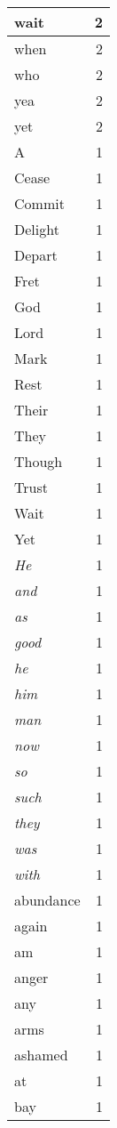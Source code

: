 \begin{center}
\begin{longtable}{l|r}
wait & 2 \\ \hline
when & 2 \\ \hline
who & 2 \\ \hline
yea & 2 \\ \hline
yet & 2 \\ \hline
A & 1 \\ \hline
Cease & 1 \\ \hline
Commit & 1 \\ \hline
Delight & 1 \\ \hline
Depart & 1 \\ \hline
Fret & 1 \\ \hline
God & 1 \\ \hline
Lord & 1 \\ \hline
Mark & 1 \\ \hline
Rest & 1 \\ \hline
Their & 1 \\ \hline
They & 1 \\ \hline
Though & 1 \\ \hline
Trust & 1 \\ \hline
Wait & 1 \\ \hline
Yet & 1 \\ \hline
\emph{He} & 1 \\ \hline
\emph{and} & 1 \\ \hline
\emph{as} & 1 \\ \hline
\emph{good} & 1 \\ \hline
\emph{he} & 1 \\ \hline
\emph{him} & 1 \\ \hline
\emph{man} & 1 \\ \hline
\emph{now} & 1 \\ \hline
\emph{so} & 1 \\ \hline
\emph{such} & 1 \\ \hline
\emph{they} & 1 \\ \hline
\emph{was} & 1 \\ \hline
\emph{with} & 1 \\ \hline
abundance & 1 \\ \hline
again & 1 \\ \hline
am & 1 \\ \hline
anger & 1 \\ \hline
any & 1 \\ \hline
arms & 1 \\ \hline
ashamed & 1 \\ \hline
at & 1 \\ \hline
bay & 1 \\ \hline

\end{longtable}
\end{center}
